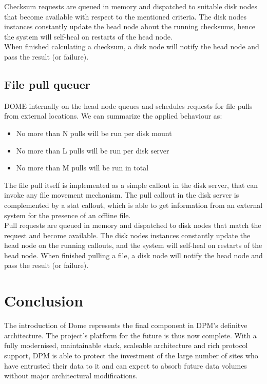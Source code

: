\documentclass[a4paper]{jpconf}
\begin{document}
 Checksum requests are queued in memory and dispatched to suitable disk nodes that become available with respect to the mentioned criteria. The disk nodes instances
 constantly update the head node about the running checksums, hence the system will self-heal on restarts of the head node.\\
 When finished calculating a checksum, a disk node will notify the head node and pass the result (or failure).\\
 
\subsection{File pull queuer}
DOME internally on the head node queues and schedules requests for file pulls from external locations. We can summarize the applied behaviour as:
 \begin{itemize}
  \item No more than N pulls will be run per disk mount\\
  \item No more than L pulls will be run per disk server\\
  \item No more than M pulls will be run in total\\
 \end{itemize}
 
The file pull itself is implemented as a simple callout in the disk server, that can invoke any file movement mechanism.
The pull callout in the disk server is complemented by a stat callout, which is able to get information from
an external system for the presence of an offline file.\\

Pull requests are queued in memory and dispatched to disk nodes that match the request and become available.
The disk nodes instances constantly update the head node on the running callouts, and the system will self-heal
on restarts of the head node. When finished pulling a file, a disk node will notify the head node and pass the result (or failure).\\

\section{Conclusion}

The introduction of Dome represents the final component in DPM's definitve architecture. The project's
platform for the future is thus now complete. With a fully modernised, maintainable stack, scaleable architecture and rich protocol support, DPM is able to protect the investment of the large number of sites who have entrusted their data to it and can expect to absorb future data volumes without major architectural modifications.
\end{document}

